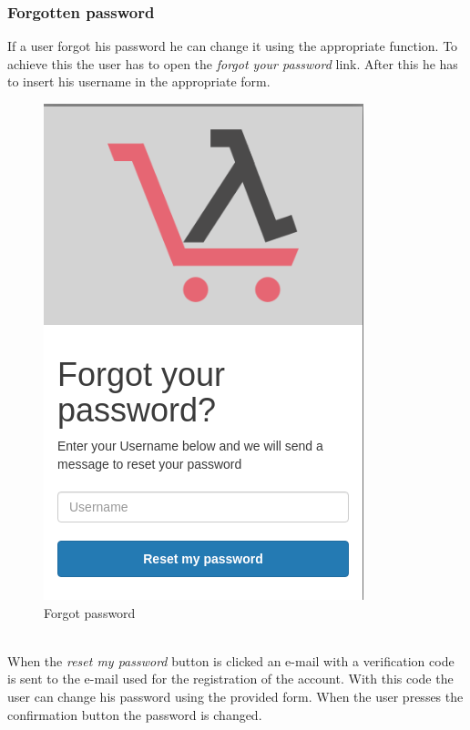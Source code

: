 \subsubsection{Forgotten password}
If a user forgot his password he can change it using the appropriate function. To achieve this the user has to open the \textit{forgot your password} link. After this he has to insert his username in the appropriate form.
\begin{figure}[!ht]
    \caption{Forgot password}
    \vspace{10px}
    \includegraphics[scale=0.3]{../../../../Images/userManual/forgotPWD.png}
    \centering
\end{figure}
\\
When the \textit{reset my password} button is clicked an e-mail with a verification code is sent to the e-mail used for the registration of the account. With this code the user can change his password using the provided form. When the user presses the confirmation button the password is changed.
